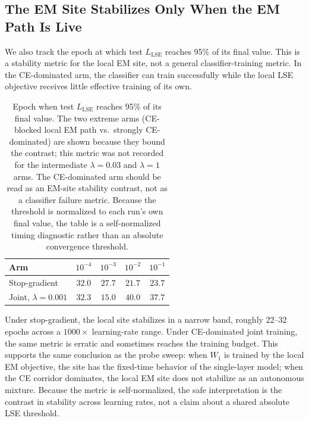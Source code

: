 \subsection{The EM Site Stabilizes Only When the EM Path Is Live}
We also track the epoch at which test $L_{\mathrm{LSE}}$ reaches 95\% of its
final value. This is a stability metric for the local EM site, not a general
classifier-training metric. In the CE-dominated arm, the classifier can train
successfully while the local LSE objective receives little effective training
of its own.
\begin{table}[h]
\centering
\begin{tabular}{lcccc}
\toprule
Arm & $10^{-4}$ & $10^{-3}$ & $10^{-2}$ & $10^{-1}$ \\
\midrule
Stop-gradient & $32.0$ & $27.7$ & $21.7$ & $23.7$ \\
Joint, $\lambda=0.001$ & $32.3$ & $15.0$ & $40.0$ & $37.7$ \\
\bottomrule
\end{tabular}
\caption{Epoch when test $L_{\mathrm{LSE}}$ reaches 95\% of its final value.
The two extreme arms (CE-blocked local EM path vs.\ strongly CE-dominated) are
shown because they bound the contrast; this metric was not recorded for the
intermediate $\lambda=0.03$ and $\lambda=1$ arms. The CE-dominated arm should
be read as an EM-site stability contrast, not as a classifier failure metric.
Because the threshold is normalized to each run's own final value, the table
is a self-normalized timing diagnostic rather than an absolute convergence
threshold.}
\label{tab:exp4-lse-time}
\end{table}
Under stop-gradient, the local site stabilizes in a narrow band, roughly
22--32 epochs across a $1000\times$ learning-rate range. Under CE-dominated
joint training, the same metric is erratic and sometimes reaches the training
budget. This supports the same conclusion as the probe sweep: when $W_1$ is
trained by the local EM objective, the site has the fixed-time behavior of the
single-layer model; when the CE corridor dominates, the local EM site does not
stabilize as an autonomous mixture. Because the metric is self-normalized, the
safe interpretation is the contrast in stability across learning rates, not a
claim about a shared absolute LSE threshold.


